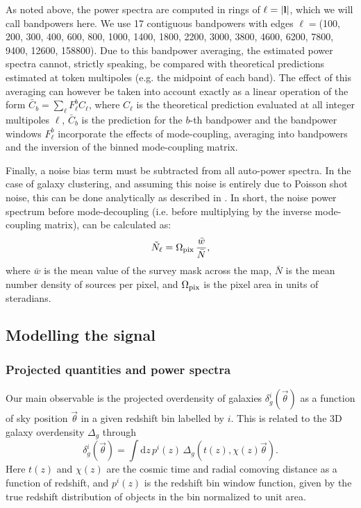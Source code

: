 \documentclass[a4paper,11pt]{article}
\newcommand{\nv}{\vec{\theta}}
\begin{document}
    As noted above, the power spectra are computed in rings of $\ell=|{\bf l}|$, which we will call bandpowers here. We use 17 contiguous bandpowers with edges $\ell=$(100, 200, 300, 400, 600, 800, 1000, 1400, 1800, 2200, 3000, 3800, 4600, 6200, 7800, 9400, 12600, 158800). Due to this bandpower averaging, the estimated power spectra cannot, strictly speaking, be compared with theoretical predictions estimated at token multipoles (e.g. the midpoint of each band). The effect of this averaging can however be taken into account exactly as a linear operation of the form $\bar{C}_b=\sum_\ell F^b_{\ell} C_\ell$, where $C_\ell$ is the theoretical prediction evaluated at all integer multipoles $\ell$, $\bar{C}_b$ is the prediction for the $b$-th bandpower and the bandpower windows $F^b_{\ell}$ incorporate the effects of mode-coupling, averaging into bandpowers and the inversion of the binned mode-coupling matrix.
    
    Finally, a noise bias term must be subtracted from all auto-power spectra. In the case of galaxy clustering, and assuming this noise is entirely due to Poisson shot noise, this can be done analytically as described in \cite{2019MNRAS.484.4127A}. In short, the noise power spectrum before mode-decoupling (i.e. before multiplying by the inverse mode-coupling matrix), can be calculated as:
    \begin{equation}\label{eq:nell}
      \tilde{N}_\ell = \Omega_{\rm pix}\,\frac{\bar{w}}{\bar{N}},
    \end{equation}
    where $\bar{w}$ is the mean value of the survey mask across the map, $\bar{N}$ is the mean number density of sources per pixel, and $\Omega_{\rm pix}$ is the pixel area in units of steradians.

  \subsection{Modelling the signal}\label{ssec:methods.theory}
  \subsubsection{Projected quantities and power spectra}\label{sssec:methods.theory.cellpk}
    Our main observable is the projected overdensity of galaxies $\delta^i_g(\nv)$ as a function of sky position $\nv$ in a given redshift bin labelled by $i$. This is related to the 3D galaxy overdensity $\Delta_g$ through
    \begin{equation}
      \delta^i_g(\nv)=\int \mathrm{d}z\,p^i(z)\,\Delta_g\left(t(z),\chi(z)\nv\right).
    \end{equation}
    Here $t(z)$ and $\chi(z)$ are the cosmic time and radial comoving distance as a function of redshift, and $p^i(z)$ is the redshift bin window function, given by the true redshift distribution of objects in the bin normalized to unit area.
  
\end{document}
